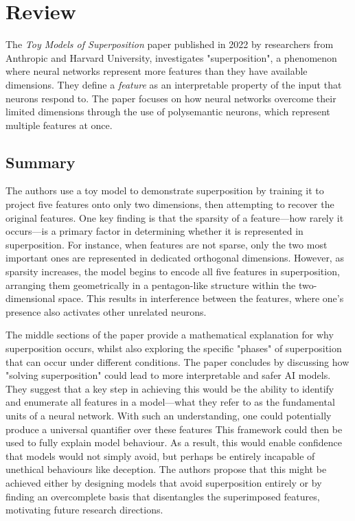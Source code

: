 \section{Review}
\label{sec:review}

The \textit{Toy Models of Superposition} paper \cite{elhage2022toy} published in 2022 by researchers from Anthropic and Harvard University, investigates "superposition", a phenomenon where neural networks represent more features than they have available dimensions.
They define a \textit{feature} as an interpretable property of the input that neurons respond to.
The paper focuses on how neural networks overcome their limited dimensions through the use of polysemantic neurons, which represent multiple features at once.


\subsection{Summary}

The authors use a toy model to demonstrate superposition by training it to project five features onto only two dimensions, then attempting to recover the original features.
One key finding is that the sparsity of a feature—how rarely it occurs—is a primary factor in determining whether it is represented in superposition. For instance, when features are not sparse, only the two most important ones are represented in dedicated orthogonal dimensions.
However, as sparsity increases, the model begins to encode all five features in superposition, arranging them geometrically in a pentagon-like structure within the two-dimensional space.
This results in interference between the features, where one's presence also activates other unrelated neurons.

The middle sections of the paper provide a mathematical explanation for why superposition occurs, whilst also exploring the specific "phases" of superposition that can occur under different conditions.
The paper concludes by discussing how "solving superposition" could lead to more interpretable and safer AI models.
They suggest that a key step in achieving this would be the ability to identify and enumerate all features in a model—what they refer to as the fundamental units of a neural network.
With such an understanding, one could potentially produce a universal quantifier over these features
This framework could then be used to fully explain model behaviour.
As a result, this would enable confidence that models would not simply avoid, but perhaps be entirely incapable of unethical behaviours like deception.
The authors propose that this might be achieved either by designing models that avoid superposition entirely or by finding an overcomplete basis that disentangles the superimposed features, motivating future research directions.

